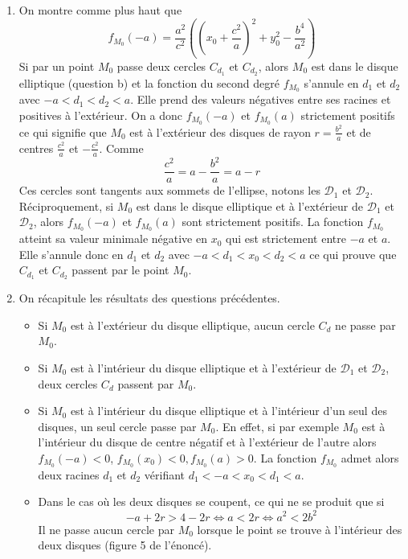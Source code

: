 \begin{enumerate}
\begin{enumerate}
\item On montre comme plus haut que
\begin{displaymath}
 f_{M_0}(-a)=\frac{a^2}{c^2}\left((x_0+\frac{c^2}{a})^2 +y_0^2-\frac{b^4}{a^2}\right)  
\end{displaymath}
Si par un point $M_0$ passe deux cercles $C_{d_1}$ et $C_{d_2}$, alors $M_0$ est dans le disque elliptique (question b) et la fonction du second degré $f_{M_0}$ s'annule en $d_1$ et $d_2$ avec $-a<d_1<d_2<a$. Elle prend des valeurs négatives entre ses racines et positives à l'extérieur. On a donc $f_{M_0}(-a)$ et $f_{M_0}(a)$ strictement positifs ce qui signifie que $M_0$ est à l'extérieur des disques de rayon $r=\frac{b^2}{a}$ et de centres $\frac{c^2}{a}$ et $-\frac{c^2}{a}$. Comme 
\begin{displaymath}
 \frac{c^2}{a}=a-\frac{b^2}{a}=a-r
\end{displaymath}
Ces cercles sont tangents aux sommets de l'ellipse, notons les $\mathcal{D}_1$ et $\mathcal{D}_2$.\newline
Réciproquement, si $M_0$ est dans le disque elliptique et à l'extérieur de $\mathcal{D}_1$ et $\mathcal{D}_2$, alors $f_{M_0}(-a)$ et $f_{M_0}(a)$ sont strictement positifs. La fonction $f_{M_0}$ atteint sa valeur minimale négative en $x_0$ qui est strictement entre $-a$ et $a$. Elle s'annule donc en $d_1$ et $d_2$ avec $-a<d_1<x_0<d_2<a$ ce qui prouve que $C_{d_1}$ et $C_{d_2}$ passent par le point $M_0$.

\item On récapitule les résultats des questions précédentes.
\begin{itemize}
 \item Si $M_0$ est à l'extérieur du disque elliptique, aucun cercle $C_d$ ne passe par $M_0$.
 \item Si $M_0$ est à l'intérieur du disque elliptique et à l'extérieur de $\mathcal{D}_1$ et $\mathcal{D}_2$, deux cercles $C_d$ passent par $M_0$.
 \item Si $M_0$ est à l'intérieur du disque elliptique et à l'intérieur d'un seul des disques, un seul cercle passe par $M_0$. En effet, si par exemple $M_0$ est à l'intérieur du disque de centre négatif et à l'extérieur de l'autre alors $f_{M_0}(-a)<0$, $f_{M_0}(x_0)<0,  f_{M_0}(a)>0$. La fonction $f_{M_0}$ admet alors deux racines $d_1$ et $d_2$ vérifiant $d_1 < -a < x_0 < d_1 < a$.
 \item Dans le cas où les deux disques se coupent, ce qui ne se produit que si 
\begin{displaymath}
 -a+2r>4-2r \Leftrightarrow a<2r \Leftrightarrow a^2 < 2b^2
\end{displaymath}
Il ne passe aucun cercle par $M_0$ lorsque le point se trouve à l'intérieur des deux disques (figure 5 de l'énoncé). 
\end{itemize}
\end{enumerate}


\end{enumerate}
